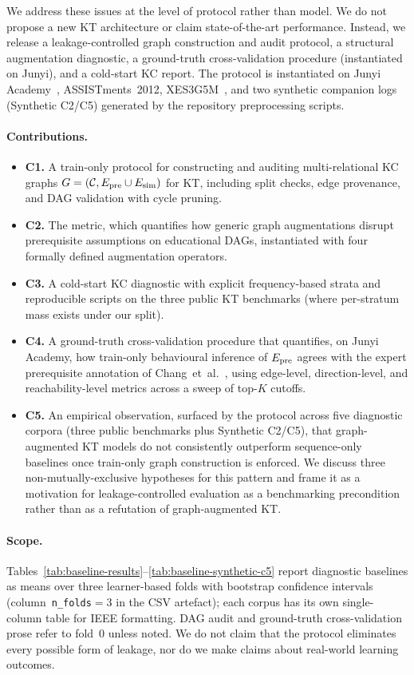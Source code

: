 We address these issues at the level of protocol rather than model. We
do not propose a new KT architecture or claim state-of-the-art
performance. Instead, we release a leakage-controlled graph construction
and audit protocol, a structural augmentation diagnostic, a ground-truth
cross-validation procedure (instantiated on Junyi), and a cold-start KC
report. The protocol is instantiated on Junyi
Academy~\cite{junyi_dataset}, ASSISTments~2012, XES3G5M~\cite{xes3g5m2023},
and two synthetic companion logs (Synthetic C2/C5) generated by the repository preprocessing scripts.
\paragraph{Contributions.}
\begin{itemize}
  \item \textbf{C1.} A train-only protocol for constructing and auditing
  multi-relational KC graphs
  $G=(\mathcal{C}, E_{\text{pre}} \cup E_{\text{sim}})$ for KT, including split checks,
  edge provenance, and DAG validation with cycle pruning.
  \item \textbf{C2.} The \DDR{} metric, which quantifies how generic
  graph augmentations disrupt prerequisite assumptions on educational
  DAGs, instantiated with four formally defined augmentation operators.
  \item \textbf{C3.} A cold-start KC diagnostic with explicit
  frequency-based strata and reproducible scripts on the three public KT
  benchmarks (where per-stratum mass exists under our split).
  \item \textbf{C4.} A ground-truth cross-validation procedure that
  quantifies, on Junyi Academy, how train-only behavioural inference of
  $E_{\text{pre}}$ agrees with the expert prerequisite annotation of
  Chang~et~al.~\cite{junyi_dataset}, using edge-level, direction-level,
  and reachability-level metrics across a sweep of top-$K$ cutoffs.
  \item \textbf{C5.} An empirical observation, surfaced by the protocol
  across five diagnostic corpora (three public benchmarks plus Synthetic C2/C5), that graph-augmented KT models do not consistently
  outperform sequence-only baselines once train-only graph construction
  is enforced. We discuss three non-mutually-exclusive hypotheses for
  this pattern and frame it as a motivation for leakage-controlled
  evaluation as a benchmarking precondition rather than as a refutation
  of graph-augmented KT.
\end{itemize}
\paragraph{Scope.}
Tables~\ref{tab:baseline-results}--\ref{tab:baseline-synthetic-c5} report diagnostic baselines as means
over three learner-based folds with bootstrap confidence intervals
(column~\texttt{n\_folds}${}=3$ in the CSV artefact); each corpus has its own single-column table for IEEE formatting.
DAG audit and
ground-truth cross-validation prose refer to fold~0 unless noted.
We do not claim that the protocol eliminates
every possible form of leakage, nor do we make claims about real-world
learning outcomes.
